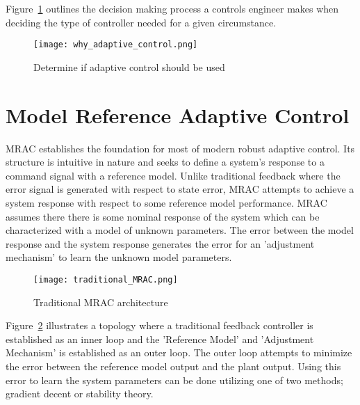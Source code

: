 Figure~\ref{fig:why_adaptive_control} outlines the decision making process a controls engineer makes when deciding the type of controller needed for a given circumstance.



\begin{figure}[h!]
 \centering
  \texttt{[image: why\_adaptive\_control.png]}
  \caption{Determine if adaptive control should be used}
  \label{fig:why_adaptive_control}
\end{figure}


\section{Model Reference Adaptive Control}
\ac{MRAC} establishes the foundation for most of modern robust adaptive control.  Its structure is intuitive in nature and seeks to define a system's response to a command signal with a reference model.  Unlike traditional feedback where the error signal is generated with respect to state error, \ac{MRAC} attempts to achieve a system response with respect to some reference model performance. \ac{MRAC} assumes there there is some nominal response of the system which can be characterized with a model of unknown parameters.  The error between the model response and the system response generates the error for an 'adjustment mechanism' to learn the unknown model parameters.

\begin{figure}[h!]
 \centering
  \texttt{[image: traditional\_MRAC.png]}
  \caption{Traditional \ac{MRAC} architecture }
  \label{fig:traditional_mrac}
\end{figure}

Figure~\ref{fig:traditional_mrac} illustrates a topology where a traditional feedback controller is established as an inner loop and the 'Reference Model' and 'Adjustment Mechanism' is established as an outer loop.  The outer loop attempts to minimize the error between the reference model output and the plant output.  Using this error to learn the system parameters can be done utilizing one of two methods; gradient decent or stability theory.

